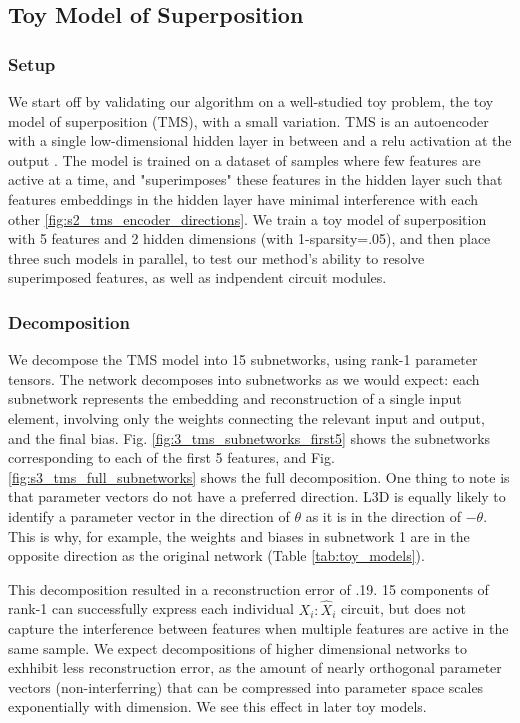 \documentclass{article}
\theoremstyle{plain}
\theoremstyle{definition}
\theoremstyle{remark}
\begin{document}
\subsection{Toy Model of Superposition}

\subsubsection{Setup}

We start off by validating our algorithm on a well-studied toy problem, the toy model of superposition (TMS), with a small variation. TMS is an autoencoder with a single low-dimensional hidden layer in between and a relu activation at the output \cite{elhage2022toy}. The model is trained on a dataset of samples where few features are active at a time, and "superimposes" these features in the hidden layer such that features embeddings in the hidden layer have minimal interference with each other \ref{fig:s2_tms_encoder_directions}. We train a toy model of superposition with 5 features and 2 hidden dimensions (with 1-sparsity=.05), and then place three such models in parallel, to test our method's ability to resolve superimposed features, as well as indpendent circuit modules.


\subsubsection{Decomposition}
We decompose the TMS model into 15 subnetworks, using rank-1 parameter tensors. The network decomposes into subnetworks as we would expect: each subnetwork represents the embedding and reconstruction of a single input element, involving only the weights connecting the relevant input and output, and the final bias. Fig. \ref{fig:3_tms_subnetworks_first5} shows the subnetworks corresponding to each of the first 5 features, and Fig. \ref{fig:s3_tms_full_subnetworks} shows the full decomposition. One thing to note is that parameter vectors do not have a preferred direction. L3D is equally likely to identify a parameter vector in the direction of $\theta$ as it is in the direction of $-\theta$. This is why, for example, the weights and biases in subnetwork 1 are in the opposite direction as the original network (Table \ref{tab:toy_models}).

This decomposition resulted in a reconstruction error of .19. 15 components of rank-1 can successfully express each individual $X_i:\hat{X}_i$ circuit, but does not capture the interference between features when multiple features are active in the same sample. We expect decompositions of higher dimensional networks to exhhibit less reconstruction error, as the amount of nearly orthogonal parameter vectors (non-interferring) that can be compressed into parameter space scales exponentially with dimension. We see this effect in later toy models. 
\end{document}
